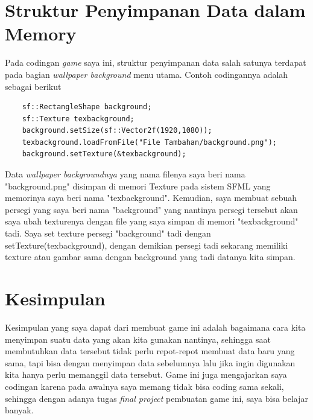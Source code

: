 \documentclass[oneside, a4paper ,12pt]{book}
\begin{document}
\chapter{Struktur Penyimpanan Data dalam Memory}
Pada codingan \emph{game} saya ini, struktur penyimpanan data salah satunya terdapat pada bagian \emph{wallpaper background} menu utama. Contoh codingannya adalah sebagai berikut
\begin{verbatim}
	sf::RectangleShape background;
	sf::Texture texbackground;
	background.setSize(sf::Vector2f(1920,1080));
	texbackground.loadFromFile("File Tambahan/background.png");
	background.setTexture(&texbackground);
\end{verbatim}
Data \emph{wallpaper backgroundnya} yang nama filenya saya beri nama "background.png" disimpan di memori Texture pada sistem SFML yang memorinya saya beri nama "texbackground". Kemudian, saya membuat sebuah persegi yang saya beri nama "background" yang nantinya persegi tersebut akan saya ubah texturenya dengan file yang saya simpan di memori "texbackground" tadi. Saya set texture persegi "background" tadi dengan setTexture(texbackground), dengan demikian persegi tadi sekarang memiliki texture atau gambar sama dengan background yang tadi datanya kita simpan.
\chapter{Kesimpulan}
Kesimpulan yang saya dapat dari membuat game ini adalah bagaimana cara kita menyimpan suatu data yang akan kita gunakan nantinya, sehingga saat membutuhkan data tersebut tidak perlu repot-repot membuat data baru yang sama, tapi bisa dengan menyimpan data sebelumnya lalu jika ingin digunakan kita hanya perlu memanggil data tersebut. Game ini juga mengajarkan saya codingan karena pada awalnya saya memang tidak bisa coding sama sekali, sehingga dengan adanya tugas \emph{final project} pembuatan game ini, saya bisa belajar banyak.
\end{document}

